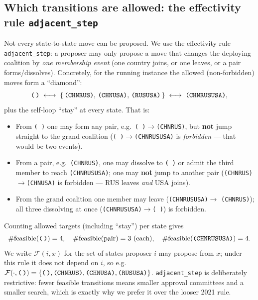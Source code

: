 \documentclass[11pt]{article}
\newcommand{\state}[1]{\texttt{(#1)}}
\newcommand{\empt}{\texttt{(\,)}}
\begin{document}
\subsection{Which transitions are allowed: the effectivity rule \texttt{adjacent\_step}}
\label{sec:adjacency}
Not every state-to-state move can be proposed. We use the effectivity rule
\texttt{adjacent\_step}: a proposer may only propose a move that changes the
deploying coalition by \emph{one membership event} (one country joins, or one
leaves, or a pair forms/dissolves). Concretely, for the running instance the allowed
(non-forbidden) moves form a ``diamond'':
\[
\empt \;\longleftrightarrow\; \{\,\state{CHNRUS},\,\state{CHNUSA},\,\state{RUSUSA}\,\}
\;\longleftrightarrow\; \state{CHNRUSUSA},
\]
plus the self-loop ``stay'' at every state. That is:
\begin{itemize}[nosep]
\item From \empt{} one may form any pair, e.g.\ \empt$\to$\state{CHNRUS}, but
\textbf{not} jump straight to the grand coalition (\empt$\to$\state{CHNRUSUSA} is
\emph{forbidden} --- that would be two events).
\item From a pair, e.g.\ \state{CHNRUS}, one may dissolve to \empt{} or admit the
third member to reach \state{CHNRUSUSA}; one may \textbf{not} jump to another pair
(\state{CHNRUS}$\to$\state{CHNUSA} is forbidden --- RUS leaves \emph{and} USA joins).
\item From the grand coalition one member may leave (\state{CHNRUSUSA}$\to$
\state{CHNRUS}); all three dissolving at once (\state{CHNRUSUSA}$\to$\empt) is
forbidden.
\end{itemize}
Counting allowed targets (including ``stay'') per state gives
\[
\#\text{feasible}(\empt)=4,\quad \#\text{feasible}(\text{pair})=3\ \text{(each)},\quad
\#\text{feasible}(\state{CHNRUSUSA})=4 .
\]
We write $\mathcal{F}(i,x)$ for the set of states proposer $i$ may propose from $x$;
under this rule it does not depend on $i$, so e.g.\ $\mathcal{F}(\cdot,\empt)=
\{\empt,\state{CHNRUS},\state{CHNUSA},\state{RUSUSA}\}$. \texttt{adjacent\_step} is
deliberately restrictive: fewer feasible transitions means smaller approval
committees and a smaller search, which is exactly why we prefer it over the looser
2021 rule.
\end{document}
